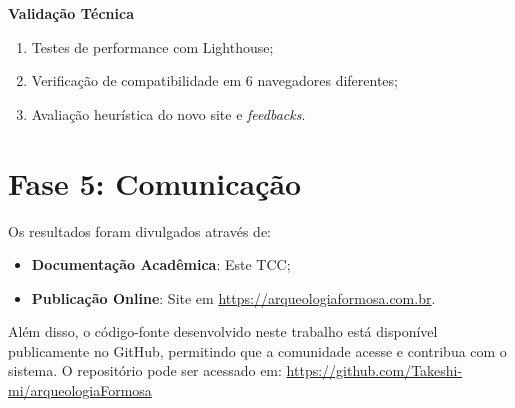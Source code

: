     \textbf{Validação Técnica}
    \begin{enumerate}
        \item Testes de performance com Lighthouse;
        \item Verificação de compatibilidade em 6 navegadores diferentes;
        \item Avaliação heurística do novo site e \textit{feedbacks}.
    \end{enumerate}
    

\section{Fase 5: Comunicação} \label{sec:comunicacao-dsr}

Os resultados foram divulgados através de:
\begin{itemize}
    \item \textbf{Documentação Acadêmica}: Este TCC;
    \item \textbf{Publicação Online}: Site em \url{https://arqueologiaformosa.com.br}.
\end{itemize}

Além disso, o código-fonte desenvolvido neste trabalho está disponível publicamente no GitHub, permitindo que a comunidade acesse e contribua com o sistema. O repositório pode ser acessado em: \href{https://github.com/Takeshi-mi/arqueologiaFormosa}{https://github.com/Takeshi-mi/arqueologiaFormosa}